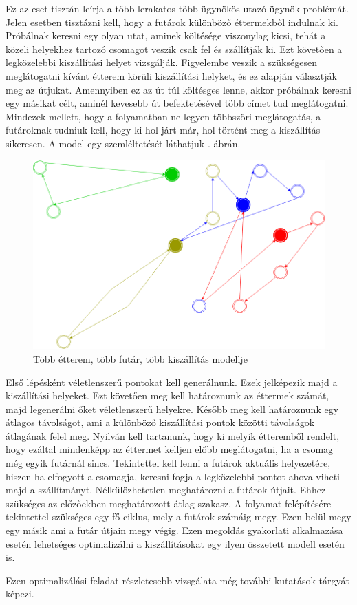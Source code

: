 

Ez az eset tisztán leírja a több lerakatos több ügynökös utazó ügynök problémát. Jelen esetben tisztázni kell, hogy a futárok különböző éttermekből indulnak ki. Próbálnak keresni egy olyan utat, aminek költésége viszonylag kicsi, tehát a közeli helyekhez tartozó csomagot veszik csak fel és szállítják ki. Ezt követően a legközelebbi kiszállítási helyet vizsgálják. Figyelembe veszik a szükségesen meglátogatni kívánt étterem körüli kiszállítási helyket, és ez alapján választják meg az útjukat. Amennyiben ez az út túl költésges lenne, akkor próbálnak keresni egy másikat célt, aminél kevesebb út befektetésével több címet tud meglátogatni. Mindezek mellett, hogy a folyamatban ne legyen többszöri meglátogatás, a futároknak tudniuk kell, hogy ki hol járt már, hol történt meg a kiszállítás sikeresen.
A model egy szemléltetését láthatjuk . ábrán.\cite{Diagrams.net}

\begin{figure}[h!]
\centering
\includegraphics[scale=0.45]{images/model5.png}
\caption{Több étterem, több futár, több kiszállítás modellje}
\label{fig:model5}
\end{figure}


Első lépésként véletlenszerű pontokat kell generálnunk. Ezek jelképezik majd a kiszállítási helyeket. Ezt követően meg kell határoznunk az éttermek számát, majd legenerálni őket véletlenszerű helyekre. Később meg kell határoznunk egy átlagos távolságot, ami a különböző kiszállítási pontok közötti távolságok átlagának felel meg. Nyilván kell tartanunk, hogy ki melyik étteremből rendelt, hogy ezáltal mindenképp az éttermet kelljen előbb meglátogatni, ha a csomag még egyik futárnál sincs. Tekintettel kell lenni a futárok aktuális helyezetére, hiszen ha elfogyott a csomagja, keresni fogja a legközelebbi pontot ahova viheti majd a szállítmányt. Nélkülözhetetlen meghatározni a futárok útjait. Ehhez szükséges az előzőekben meghatározott átlag szakasz. A folyamat felépítésére tekintettel szükséges egy fő ciklus, mely a futárok számáig megy. Ezen belül megy egy másik ami a futár útjain megy végig. Ezen megoldás gyakorlati alkalmazása esetén lehetséges optimalizálni a kiszállításokat egy ilyen összetett modell esetén is.

Ezen optimalizálási feladat részletesebb vizsgálata még további kutatások tárgyát képezi.
